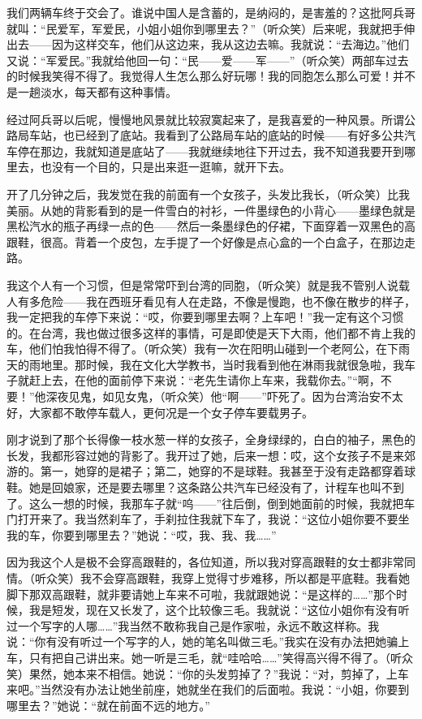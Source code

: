 \par 我们两辆车终于交会了。谁说中国人是含蓄的，是纳闷的，是害羞的？这批阿兵哥就叫：“民爱军，军爱民，小姐小姐你到哪里去？”（听众笑）后来呢，我就把手伸出去——因为这样交车，他们从这边来，我从这边去嘛。我就说：“去海边。”他们又说：“军爱民。”我就给他回一句：“民——爱——军——”（听众笑）两部车过去的时候我笑得不得了。我觉得人生怎么那么好玩哪！我的同胞怎么那么可爱！并不是一趟淡水，每天都有这种事情。
\par 经过阿兵哥以后呢，慢慢地风景就比较寂寞起来了，是我喜爱的一种风景。所谓公路局车站，也已经到了底站。我看到了公路局车站的底站的时候——有好多公共汽车停在那边，我就知道是底站了——我就继续地往下开过去，我不知道我要开到哪里去，也没有一个目的，只是出来逛一逛嘛，就开下去。
\par 开了几分钟之后，我发觉在我的前面有一个女孩子，头发比我长，（听众笑）比我美丽。从她的背影看到的是一件雪白的衬衫，一件墨绿色的小背心——墨绿色就是黑松汽水的瓶子再绿一点的色——然后一条墨绿色的仔裙，下面穿着一双黑色的高跟鞋，很高。背着一个皮包，左手提了一个好像是点心盒的一个白盒子，在那边走路。
\par 我这个人有一个习惯，但是常常吓到台湾的同胞，（听众笑）就是我不管别人说载人有多危险——我在西班牙看见有人在走路，不像是慢跑，也不像在散步的样子，我一定把我的车停下来说：“哎，你要到哪里去啊？上车吧！”我一定有这个习惯的。在台湾，我也做过很多这样的事情，可是即使是天下大雨，他们都不肯上我的车，他们怕我怕得不得了。（听众笑）我有一次在阳明山碰到一个老阿公，在下雨天的雨地里。那时候，我在文化大学教书，当时我看到他在淋雨我就很急啦，我车子就赶上去，在他的面前停下来说：“老先生请你上车来，我载你去。”“啊，不要！”他深夜见鬼，如见女鬼，（听众笑）他“啊——”吓死了。因为台湾治安不太好，大家都不敢停车载人，更何况是一个女子停车要载男子。
\par 刚才说到了那个长得像一枝水葱一样的女孩子，全身绿绿的，白白的袖子，黑色的长发，我都形容过她的背影了。我开过了她，后来一想：哎，这个女孩子不是来郊游的。第一，她穿的是裙子；第二，她穿的不是球鞋。我甚至于没有走路都穿着球鞋。她是回娘家，还是要去哪里？这条路公共汽车已经没有了，计程车也叫不到了。这么一想的时候，我那车子就“呜——”往后倒，倒到她面前的时候，我就把车门打开来了。我当然刹车了，手刹拉住我就下车了，我说：“这位小姐你要不要坐我的车，你要到哪里去？”她说：“哎，我、我、我……”
\par 因为我这个人是极不会穿高跟鞋的，各位知道，所以我对穿高跟鞋的女士都非常同情。（听众笑）我不会穿高跟鞋，我穿上觉得寸步难移，所以都是平底鞋。我看她脚下那双高跟鞋，就非要请她上车来不可啦，我就跟她说：“是这样的……”那个时候，我是短发，现在又长发了，这个比较像三毛。我就说：“这位小姐你有没有听过一个写字的人哪……”我当然不敢称我自己是作家啦，永远不敢这样称。我说：“你有没有听过一个写字的人，她的笔名叫做三毛。”我实在没有办法把她骗上车，只有把自己讲出来。她一听是三毛，就“哇哈哈……”笑得高兴得不得了。（听众笑）果然，她本来不相信。她说：“你的头发剪掉了？”我说：“对，剪掉了，上车来吧。”当然没有办法让她坐前座，她就坐在我们的后面啦。我说：“小姐，你要到哪里去？”她说：“就在前面不远的地方。”
